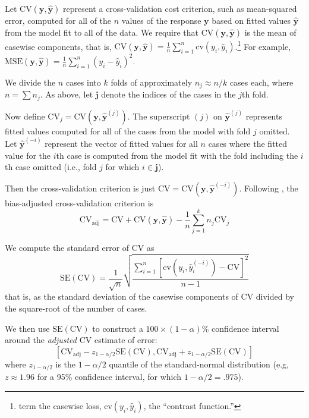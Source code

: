 \documentclass[
]{jss}
\begin{document}
Let \(\mathrm{CV}(\mathbf{y}, \widehat{\mathbf{y}})\) represent a
cross-validation cost criterion, such as mean-squared error, computed
for all of the \(n\) values of the response \(\mathbf{y}\) based on
fitted values \(\widehat{\mathbf{y}}\) from the model fit to all of the
data. We require that \(\mathrm{CV}(\mathbf{y}, \widehat{\mathbf{y}})\)
is the mean of casewise components, that is,
\(\mathrm{CV}(\mathbf{y}, \widehat{\mathbf{y}}) = \frac{1}{n}\sum_{i=1}^n\mathrm{cv}(y_i, \widehat{y}_i)\).\footnote{\citet{ArlotCelisse:2010}
  term the casewise loss, \(\mathrm{cv}(y_i, \widehat{y}_i)\), the
  ``contrast function.''} For example,
\(\mathrm{MSE}(\mathbf{y}, \widehat{\mathbf{y}}) = \frac{1}{n}\sum_{i=1}^n (y_i - \widehat{y}_i)^2\).

We divide the \(n\) cases into \(k\) folds of approximately
\(n_j \approx n/k\) cases each, where \(n = \sum n_j\). As above, let
\(\mathbf{j}\) denote the indices of the cases in the \(j\)th fold.

Now define
\(\mathrm{CV}_j = \mathrm{CV}(\mathbf{y}, \widehat{\mathbf{y}}^{(j)})\).
The superscript \((j)\) on \(\widehat{\mathbf{y}}^{(j)}\) represents
fitted values computed for all of the cases from the model with fold
\(j\) omitted. Let \(\widehat{\mathbf{y}}^{(-i)}\) represent the vector
of fitted values for all \(n\) cases where the fitted value for the
\(i\)th case is computed from the model fit with the fold including the
\(i\)th case omitted (i.e., fold \(j\) for which \(i \in \mathbf{j}\)).

Then the cross-validation criterion is just
\(\mathrm{CV} = \mathrm{CV}(\mathbf{y}, \widehat{\mathbf{y}}^{(-i)})\).
Following \citet[pp.~293--295]{DavisonHinkley:1997}, the bias-adjusted
cross-validation criterion is \[
\mathrm{CV}_{\mathrm{adj}} = \mathrm{CV} + \mathrm{CV}(\mathbf{y}, \widehat{\mathbf{y}}) - \frac{1}{n} \sum_{j=1}^{k} n_j \mathrm{CV}_j
\]

We compute the standard error of CV as \[
\mathrm{SE}(\mathrm{CV}) = \frac{1}{\sqrt n} \sqrt{ \frac{\sum_{i=1}^n \left[ \mathrm{cv}(y_i, \widehat{y}_i^{(-i)} ) - \mathrm{CV} \right]^2 }{n - 1} }
\] that is, as the standard deviation of the casewise components of CV
divided by the square-root of the number of cases.

We then use \(\mathrm{SE}(\mathrm{CV})\) to construct a
\(100 \times (1 - \alpha)\)\% confidence interval around the
\emph{adjusted} CV estimate of error: \[
\left[ \mathrm{CV}_{\mathrm{adj}} - z_{1 - \alpha/2}\mathrm{SE}(\mathrm{CV}), \mathrm{CV}_{\mathrm{adj}} + z_{1 - \alpha/2}\mathrm{SE}(\mathrm{CV})  \right]
\] where \(z_{1 - \alpha/2}\) is the \(1 - \alpha/2\) quantile of the
standard-normal distribution (e.g, \(z \approx 1.96\) for a 95\%
confidence interval, for which \(1 - \alpha/2 = .975\)).
\end{document}
